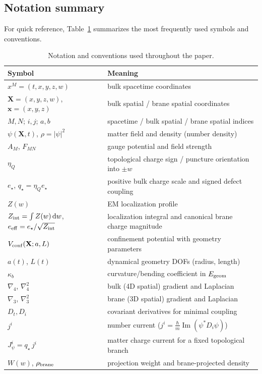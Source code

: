 \documentclass[11pt]{article}
\newcommand{\etaQ}{\eta_Q}
\newcommand{\estar}{e_\star}
\newcommand{\eeff}{e_{\rm eff}}
\newcommand{\qstar}{q_\star}
\newcommand{\Zint}{Z_{\rm int}}
\newcommand{\kappab}{\kappa_b}
\begin{document}
\subsection{Notation summary}
\label{sec:notation-summary}

For quick reference, Table~\ref{tab:notation} summarizes the most frequently used symbols and conventions.

\begin{table}[t]
\centering
\begin{tabular}{@{}ll@{}}
\toprule
Symbol & Meaning \\
\midrule
$x^M=(t,x,y,z,w)$ & bulk spacetime coordinates \\
$\mathbf{X}=(x,y,z,w)$, $\mathbf{x}=(x,y,z)$ & bulk spatial / brane spatial coordinates \\
$M,N$; $i,j$; $a,b$ & spacetime / bulk spatial / brane spatial indices \\
$\psi(\mathbf{X},t)$, $\rho=|\psi|^2$ & matter field and density (number density) \\
$A_M$, $F_{MN}$ & gauge potential and field strength \\
$\etaQ$ & topological charge sign / puncture orientation into $\pm w$ \\
$\estar$, $\qstar=\etaQ \estar$ & positive bulk charge scale and signed defect coupling \\
$Z(w)$ & EM localization profile \\
$\Zint=\int Z(w)\,\dd w$, $\eeff=\estar/\sqrt{\Zint}$ & localization integral and canonical brane charge magnitude \\
$V_{\rm conf}(\mathbf{X};a,L)$ & confinement potential with geometry parameters \\
$a(t)$, $L(t)$ & dynamical geometry DOFs (radius, length) \\
$\kappab$ & curvature/bending coefficient in $E_{\rm geom}$ \\
$\nabla_4$, $\nabla_4^2$ & bulk (4D spatial) gradient and Laplacian \\
$\nabla_3$, $\nabla_3^2$ & brane (3D spatial) gradient and Laplacian \\
$D_t, D_i$ & covariant derivatives for minimal coupling \\
$j^i$ & number current ($j^i=\frac{\hbar}{m}\operatorname{Im}(\psi^*D_i\psi)$) \\
$J_\psi^i=\qstar\,j^i$ & matter charge current for a fixed topological branch \\
$W(w)$, $\rho_{\rm brane}$ & projection weight and brane-projected density \\
\bottomrule
\end{tabular}
\caption{Notation and conventions used throughout the paper.}
\label{tab:notation}
\end{table}
\end{document}

